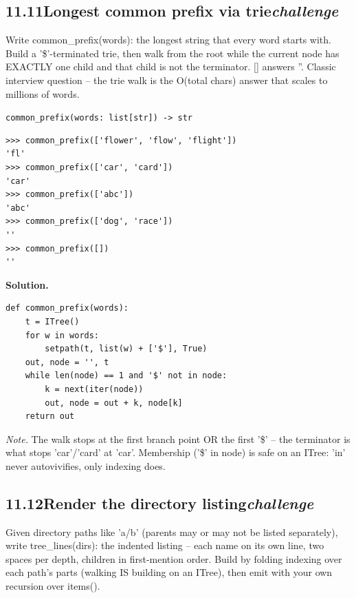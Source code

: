 \documentclass[10pt,letterpaper]{book}
\begin{document}

\subsection*{11.11\quad Longest common prefix via trie\hfill\textnormal{\textit{challenge}}}
Write common\_prefix(words): the longest string that every word starts with. Build a '\$'-terminated trie, then walk from the root while the current node has EXACTLY one child and that child is not the terminator. [] answers ''. Classic interview question -- the trie walk is the O(total chars) answer that scales to millions of words.

\noindent\texttt{common\_prefix(words: list[str]) -> str}
\begin{lstlisting}[style=ex]
>>> common_prefix(['flower', 'flow', 'flight'])
'fl'
>>> common_prefix(['car', 'card'])
'car'
>>> common_prefix(['abc'])
'abc'
>>> common_prefix(['dog', 'race'])
''
>>> common_prefix([])
''
\end{lstlisting}
\noindent\textbf{Solution.}
\begin{lstlisting}[style=code]
def common_prefix(words):
    t = ITree()
    for w in words:
        setpath(t, list(w) + ['$'], True)
    out, node = '', t
    while len(node) == 1 and '$' not in node:
        k = next(iter(node))
        out, node = out + k, node[k]
    return out
\end{lstlisting}
\noindent\textit{Note.} The walk stops at the first branch point OR the first '\$' -- the terminator is what stops 'car'/'card' at 'car'. Membership ('\$' in node) is safe on an ITree: 'in' never autovivifies, only indexing does.

\subsection*{11.12\quad Render the directory listing\hfill\textnormal{\textit{challenge}}}
Given directory paths like 'a/b' (parents may or may not be listed separately), write tree\_lines(dirs): the indented listing -- each name on its own line, two spaces per depth, children in first-mention order. Build by folding indexing over each path's parts (walking IS building on an ITree), then emit with your own recursion over items().
\end{document}
